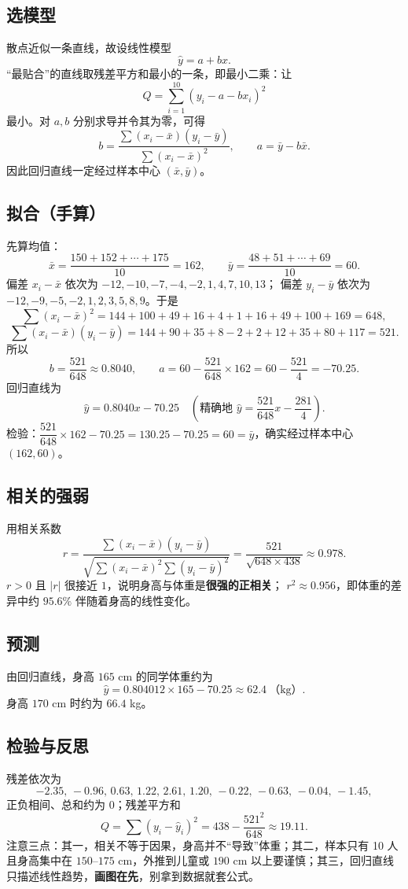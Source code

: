\subsection{选模型}
散点近似一条直线，故设线性模型
\[
  \hat y=a+bx .
\]
“最贴合”的直线取残差平方和最小的一条，即最小二乘：让
\[
  Q=\sum_{i=1}^{10}(y_i-a-bx_i)^2
\]
最小。对 $a,b$ 分别求导并令其为零，可得
\[
  b=\frac{\sum(x_i-\bar x)(y_i-\bar y)}{\sum(x_i-\bar x)^2},
  \qquad a=\bar y-b\bar x .
\]
因此回归直线一定经过样本中心 $(\bar x,\bar y)$。

\subsection{拟合（手算）}
先算均值：
\[
  \bar x=\frac{150+152+\cdots+175}{10}=162,\qquad
  \bar y=\frac{48+51+\cdots+69}{10}=60.
\]
偏差 $x_i-\bar x$ 依次为 $-12,-10,-7,-4,-2,1,4,7,10,13$；
偏差 $y_i-\bar y$ 依次为 $-12,-9,-5,-2,1,2,3,5,8,9$。于是
\[
  \sum(x_i-\bar x)^2=144+100+49+16+4+1+16+49+100+169=648,
\]
\[
  \sum(x_i-\bar x)(y_i-\bar y)=144+90+35+8-2+2+12+35+80+117=521.
\]
所以
\[
  b=\frac{521}{648}\approx0.8040,\qquad
  a=60-\frac{521}{648}\times162=60-\frac{521}{4}=-70.25.
\]
回归直线为
\[
  \hat y=0.8040x-70.25
  \quad\left(\text{精确地 }\hat y=\frac{521}{648}x-\frac{281}{4}\right).
\]
检验：$\dfrac{521}{648}\times162-70.25=130.25-70.25=60=\bar y$，确实经过样本中心 $(162,60)$。

\subsection{相关的强弱}
用相关系数
\[
  r=\frac{\sum(x_i-\bar x)(y_i-\bar y)}
          {\sqrt{\sum(x_i-\bar x)^2\sum(y_i-\bar y)^2}}
    =\frac{521}{\sqrt{648\times438}}\approx0.978.
\]
$r>0$ 且 $|r|$ 很接近 $1$，说明身高与体重是\textbf{很强的正相关}；
$r^2\approx0.956$，即体重的差异中约 $95.6\%$ 伴随着身高的线性变化。

\subsection{预测}
由回归直线，身高 $165$ cm 的同学体重约为
\[
  \hat y=0.804012\times165-70.25\approx62.4\ \text{（kg）}.
\]
身高 $170$ cm 时约为 $66.4$ kg。

\subsection{检验与反思}
残差依次为
\[
  -2.35,\,-0.96,\,0.63,\,1.22,\,2.61,\,1.20,\,-0.22,\,-0.63,\,-0.04,\,-1.45,
\]
正负相间、总和约为 $0$；残差平方和
\[
  Q=\sum(y_i-\hat y_i)^2=438-\frac{521^2}{648}\approx19.11.
\]
注意三点：其一，相关不等于因果，身高并不“导致”体重；其二，样本只有 10 人且身高集中在 $150$–$175$ cm，外推到儿童或 $190$ cm 以上要谨慎；其三，回归直线只描述线性趋势，\textbf{画图在先}，别拿到数据就套公式。

